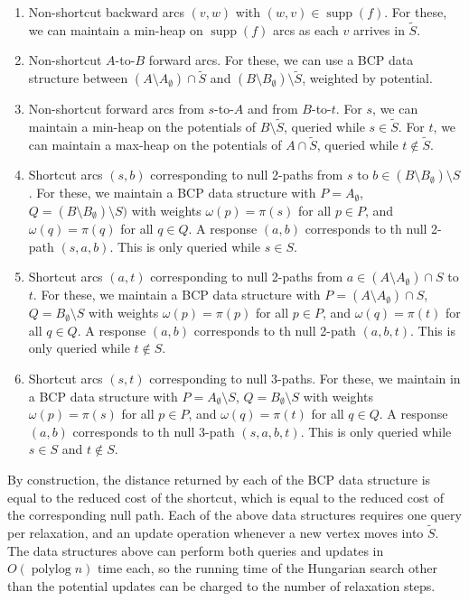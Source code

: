 \documentclass[a4paper,UKenglish]{socg-lipics-v2018}
\def\polylog{\mathop{\mathrm{polylog}}}
\def\supp{\operatorname{supp}}
\theoremstyle{plain}
\numberwithin{figure}{section}
\begin{document}
\begin{toappendix}

\begin{enumerate}
\item Non-shortcut backward arcs $(v, w)$ with $(w, v) \in \supp(f)$.
	For these, we can maintain a min-heap on $\supp(f)$ arcs as each $v$
	arrives in $\tilde{S}$.
\item Non-shortcut $A$-to-$B$ forward arcs.
	For these, we can use a BCP data structure between
	$(A \setminus A_\emptyset) \cap \tilde{S}$ and
	$(B \setminus B_\emptyset) \setminus \tilde{S}$, weighted by potential.
\item Non-shortcut forward arcs from $s$-to-$A$ and from $B$-to-$t$.
	For $s$, we can maintain a min-heap on the potentials of
	$B \setminus \tilde{S}$, queried while $s \in \tilde{S}$.
	For $t$, we can maintain a max-heap on the potentials of
	$A \cap \tilde{S}$, queried while $t \not\in \tilde{S}$.

\item Shortcut arcs $(s, b)$ corresponding to null 2-paths from $s$ to
	$b \in (B \setminus B_\emptyset) \setminus S$.
	For these, we maintain a BCP data structure with $P = A_\emptyset$,
	$Q = (B \setminus B_\emptyset) \setminus S)$ with weights
	$\omega(p) = \pi(s)$ for all $p \in P$, and $\omega(q) = \pi(q)$ for
	all $q \in Q$.
	A response $(a, b)$ corresponds to th null 2-path $(s, a, b)$.
	This is only queried while $s \in S$.
\item Shortcut arcs $(a, t)$ corresponding to null 2-paths from
	$a \in (A \setminus A_\emptyset) \cap S$ to $t$.
	For these, we maintain a BCP data structure with
	$P = (A \setminus A_\emptyset) \cap S$,
	$Q = B_\emptyset \setminus S$ with weights $\omega(p) = \pi(p)$ for
	all $p \in P$, and $\omega(q) = \pi(t)$ for all $q \in Q$.
	A response $(a, b)$ corresponds to th null 2-path $(a, b, t)$.
	This is only queried while $t \not\in S$.
\item Shortcut arcs $(s, t)$ corresponding to null 3-paths.
	For these, we maintain in a BCP data structure with
	$P = A_\emptyset \setminus S$, $Q = B_\emptyset \setminus S$ with
	weights $\omega(p) = \pi(s)$ for all
	$p \in P$, and $\omega(q) = \pi(t)$ for all $q \in Q$.
	A response $(a, b)$ corresponds to th null 3-path $(s, a, b, t)$.
	This is only queried while $s \in S$ and $t \not\in S$.
\end{enumerate}

\end{toappendix}

By construction, the distance returned by
each of the BCP data structure
is equal to the reduced cost of the shortcut, which is equal to the reduced cost of the corresponding null path.
Each of the above data structures requires one query per relaxation, and an update operation whenever a new vertex moves into $\tilde{S}$.
The data structures above can perform both queries and updates in $O(\polylog n)$ time each, so the
running time of the Hungarian search other than the potential updates can be
charged to the number of relaxation steps.
\end{document}
